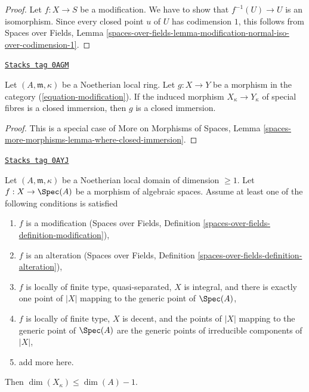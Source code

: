 \begin{proof}
Let $f : X \to S$ be a modification. We have to show that
$f^{-1}(U) \to U$ is an isomorphism. Since every closed point $u$ of $U$
has codimension $1$, this follows from
Spaces over Fields, Lemma
\ref{spaces-over-fields-lemma-modification-normal-iso-over-codimension-1}.
\end{proof}

\begin{lemma}
\label{spaces-resolve-lemma-closed-immersion-on-fibre}
\href{https://stacks.math.columbia.edu/tag/0AGM}{\texttt{Stacks tag 0AGM}}

Let $(A, \mathfrak m, \kappa)$ be a Noetherian local ring.
Let $g : X \to Y$ be a morphism in the category (\ref{equation-modification}).
If the induced morphism $X_\kappa \to Y_\kappa$ of special fibres is
a closed immersion, then $g$ is a closed immersion.
\end{lemma}

\begin{proof}
This is a special case of
More on Morphisms of Spaces, Lemma
\ref{spaces-more-morphisms-lemma-where-closed-immersion}.
\end{proof}

\begin{lemma}
\label{spaces-resolve-lemma-dimension-special-fibre}
\href{https://stacks.math.columbia.edu/tag/0AYJ}{\texttt{Stacks tag 0AYJ}}

Let $(A, \mathfrak m, \kappa)$ be a Noetherian local domain
of dimension $\geq 1$.
Let $f : X \to \Spec(A)$ be a morphism of algebraic spaces.
Assume at least one of the following conditions is satisfied
\begin{enumerate}
\item $f$ is a modification (Spaces over Fields, Definition
\ref{spaces-over-fields-definition-modification}),
\item $f$ is an alteration (Spaces over Fields, Definition
\ref{spaces-over-fields-definition-alteration}),
\item $f$ is locally of finite type, quasi-separated, $X$ is integral,
and there is exactly one point of $|X|$ mapping to the generic point
of $\Spec(A)$,
\item $f$ is locally of finite type, $X$ is decent, and the points
of $|X|$ mapping to the generic point of $\Spec(A)$ are
the generic points of irreducible components of $|X|$,
\item add more here.
\end{enumerate}
Then $\dim(X_\kappa) \leq \dim(A) - 1$.
\end{lemma}

